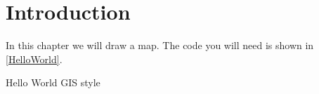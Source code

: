 \chapter{Introduction}\label{introduction}
In this chapter we will draw a map. The code you will need is shown in \cref{HelloWorld}.
\begin{mdframed}[linecolor=black, topline=true, bottomline=true,
  leftline=false, rightline=false]
\end{mdframed}\begin{listing}
\caption{Hello World GIS style}
\label{HelloWorld}
\end{listing}
